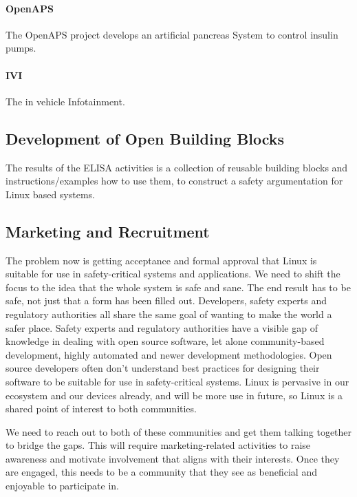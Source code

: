 \documentclass[12pt]{../Common_files/ElisaPaper}
\begin{document}
\paragraph{OpenAPS}

The OpenAPS project develops an artificial pancreas System to control insulin pumps.
%
\label{sssec:OpenAPS}

\paragraph{IVI}
\label{sssec:IVI}
The in vehicle Infotainment.

\subsection{Development of Open Building Blocks}
The results of the ELISA activities is a collection of reusable building blocks and instructions/examples how to use them, to construct a safety argumentation for Linux based systems.

\subsection{Marketing and Recruitment}
The problem now is getting acceptance and formal approval that Linux is suitable for use in safety-critical systems and applications.
We need to shift the focus to the idea that the whole system is safe and sane.
The end result has to be safe, not just that a form has been filled out.
Developers, safety experts and regulatory authorities all share the same goal of wanting to make the world a safer place.
Safety experts and regulatory authorities have a visible gap of knowledge in dealing with open source software, 
let alone community-based development, highly automated and newer development methodologies.
Open source developers often don’t understand best practices for designing their software to be suitable for use in safety-critical systems.
Linux is pervasive in our ecosystem and our devices already, 
and will be more use in future, 
so Linux is a shared point of interest to both communities.   


We need to reach out to both of these communities and get them talking together to bridge the gaps.
This will require marketing-related activities to raise awareness 
and motivate involvement that aligns with their interests.
Once they are engaged, this needs to be a community that they see as beneficial and enjoyable to participate in. 
\end{document}
